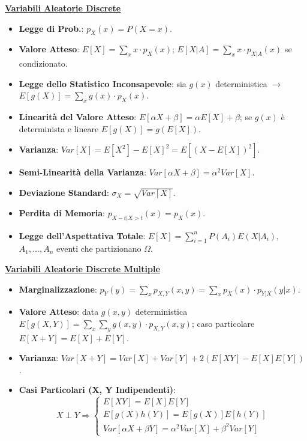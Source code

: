 \documentclass[8pt]{extarticle}
\begin{document}
\begin{multicols*}{3}
    \textbf{\underline{Variabili Aleatorie Discrete}}
    \begin{itemize}
        \item \textbf{Legge di Prob.}: $p_{X}(x)=P(X=x)$.
        \item \textbf{Valore Atteso}: $E[X]=\sum_{x}x\cdot p_{X}(x)$; $E[X|A]=\sum_{x}x\cdot p_{X|A}(x)$ se condizionato.
        \item \textbf{Legge dello Statistico Inconsapevole}: sia $g(x)$ deterministica $\rightarrow$ $E[g(X)]=\sum_{x}g(x)\cdot p_{X}(x)$.
        \item \textbf{Linearità del Valore Atteso}: $E[\alpha X+\beta]=\alpha E[X]+\beta$; se $g(x)$ è determinista e lineare $E[g(X)]=g(E[X])$.
        \item \textbf{Varianza}: $Var[X]=E[X^{2}]-E[X]^{2}=E[(X-E[X])^{2}]$.
        \item \textbf{Semi-Linearità della Varianza}: $Var[\alpha X+\beta]=\alpha^{2}Var[X]$.
        \item \textbf{Deviazione Standard}: $\sigma_{X}=\sqrt{Var[X]}$.
        \item \textbf{Perdita di Memoria}: $p_{X-t|X>t}(x)=p_{X}(x)$.
        \item \textbf{Legge dell'Aspettativa Totale}: $E[X]=\sum_{i=1}^{n}P(A_{i})E(X|A_{i})$, $A_{1},...,A_{n}$ eventi che partizionano $\Omega$.
    \end{itemize}

    \textbf{\underline{Variabili Aleatorie Discrete Multiple}}
    \begin{itemize}
        \item \textbf{Marginalizzazione}: $p_{Y}(y)=\sum_{x}p_{X,Y}(x,y)=\sum_{x}p_{X}(x)\cdot p_{Y|X}(y|x)$.
        \item \textbf{Valore Atteso}: data $g(x,y)$ deterministica $E[g(X,Y)]=\sum_{x}\sum_{y}g(x,y)\cdot p_{X,Y}(x,y)$; caso particolare $E[X+Y]=E[X]+E[Y]$.
        \item \textbf{Varianza}: $Var[X+Y]=Var[X]+Var[Y]+2(E[XY]-E[X]E[Y])$.
        \item \textbf{Casi Particolari (X, Y Indipendenti)}:
              \useshortskip \begin{equation*}
                  X\perp Y\Rightarrow \begin{cases}E[XY]=E[X]E[Y]\\ E[g(X)h(Y)]=E[g(X)]E[h(Y)]\\Var[\alpha X+\beta Y]=\alpha^{2}Var[X]+\beta^{2}Var[Y]\end{cases}
              \end{equation*}
    \end{itemize}


\end{multicols*}
\end{document}
